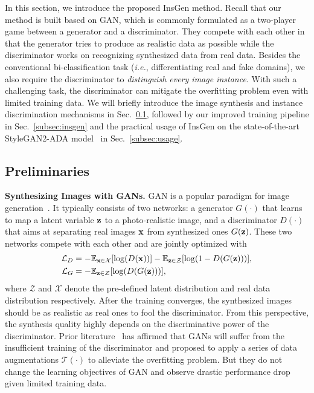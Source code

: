 \documentclass{article}
\newcommand{\E}{\mathbb{E}}      \newcommand{\z}{{\rm\bf z}}      \newcommand{\Z}{\mathcal{Z}}     \newcommand{\x}{{\rm\bf x}}      \newcommand{\X}{\mathcal{X}}     \renewcommand{\v}{{\rm\bf v}}    \newcommand{\T}{{\mathcal{T}}}   \renewcommand{\L}{{\mathcal{L}}} \newcommand{\C}{{\mathcal{C}}}
\begin{document}
In this section, we introduce the proposed InsGen method.
Recall that our method is built based on GAN, which is commonly formulated as a two-player game between a generator and a discriminator.
They compete with each other in that the generator tries to produce as realistic data as possible while the discriminator works on recognizing synthesized data from real data.
Besides the conventional bi-classification task (\textit{i.e.}, differentiating real and fake domains), we also require the discriminator to \textit{distinguish every image instance}.
With such a challenging task, the discriminator can mitigate the overfitting problem even with limited training data.
We will briefly introduce the image synthesis and instance discrimination mechanisms in Sec.~\ref{subsec:preliminary}, followed by our improved training pipeline in Sec.~\ref{subsec:insgen} and the practical usage of InsGen on the state-of-the-art StyleGAN2-ADA model~\cite{karras2020training} in Sec.~\ref{subsec:usage}.


\subsection{Preliminaries}\label{subsec:preliminary}


\textbf{Synthesizing Images with GANs.}
GAN is a popular paradigm for image generation~\cite{goodfellow2014generative}.
It typically consists of two networks: a generator $G(\cdot)$ that learns to map a latent variable $\z$ to a photo-realistic image, and a discriminator $D(\cdot)$ that aims at separating real images $\x$ from synthesized ones $G(\z)$.
These two networks compete with each other and are jointly optimized with
\begin{align}
    \L_D & = - \E_{\x\in\X}[\log(D(\x))] - \E_{\z\in\Z}[\log(1-D(G(\z)))], \label{eqa:loss_d} \\
    \L_G & = - \E_{\z\in\Z}[\log(D(G(\z)))], \label{eqa:loss_g}
\end{align}
where $\Z$ and $\X$ denote the pre-defined latent distribution and real data distribution respectively.
After the training converges, the synthesized images should be as realistic as real ones to fool the discriminator.
From this perspective, the synthesis quality highly depends on the discriminative power of the discriminator.
Prior literature~\cite{karras2020training, tran2021data, zhao2020differentiable, zhao2020image} has affirmed that GANs will suffer from the insufficient training of the discriminator and proposed to apply a series of data augmentations $\T(\cdot)$ to alleviate the overfitting problem.
But they do not change the learning objectives of GAN and observe drastic performance drop given limited training data.
\end{document}

